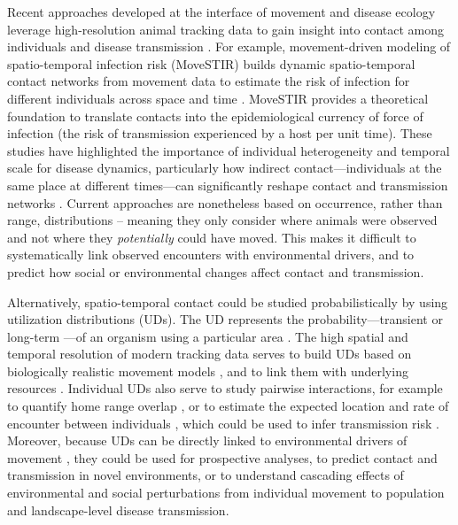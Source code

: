\documentclass[letterpaper]{article}
\begin{document}
Recent approaches developed at the interface of movement and disease ecology leverage high-resolution animal tracking data to gain insight into contact among individuals and disease transmission \citep{Richardson2015,Wilber2022,Yang2023}. For example, movement-driven modeling of spatio-temporal infection risk (MoveSTIR) builds dynamic spatio-temporal contact networks from movement data to estimate the risk of infection for different individuals across space and time \citep{Wilber2022}. MoveSTIR provides a theoretical foundation to translate contacts into the epidemiological currency of force of infection (the risk of transmission experienced by a host per unit time). These studies have highlighted the importance of individual heterogeneity and temporal scale for disease dynamics, particularly how indirect contact---individuals at the same place at different times---can significantly reshape contact and transmission networks \citep{Richardson2015,Yang2023}. Current approaches are nonetheless based on occurrence, rather than range, distributions \citep[in the terminology of ][]{Alston2022} -- meaning they only consider where animals were observed and not where they \emph{potentially} could have moved. This makes it difficult to systematically link observed encounters with environmental drivers, and to predict how social or environmental changes affect contact and transmission. 

Alternatively, spatio-temporal contact could be studied probabilistically by using utilization distributions (UDs). The UD represents the probability---transient or long-term \citep{Tao2016}---of an organism using a particular area \citep{Worton1989}. The high spatial and temporal resolution of modern tracking data serves to build UDs based on biologically realistic movement models \citep{Kranstauber2012,Fleming2014}, and to link them with underlying resources \citep{Potts2023}.
Individual UDs also serve to study pairwise interactions, for example to quantify home range overlap \citep{Winner2018}, or to estimate the expected location and rate of encounter between individuals \citep{Noonan2021}, which could be used to infer transmission risk \citep{Godfrey2010, Godfrey2013,Noonan2021}. 
Moreover, because UDs can be directly linked to environmental drivers of movement \citep{Signer2017}, they could be used for prospective analyses, to predict contact and transmission in novel environments, or to understand cascading effects of environmental and social perturbations from individual movement to population and landscape-level disease transmission. 
\end{document}
